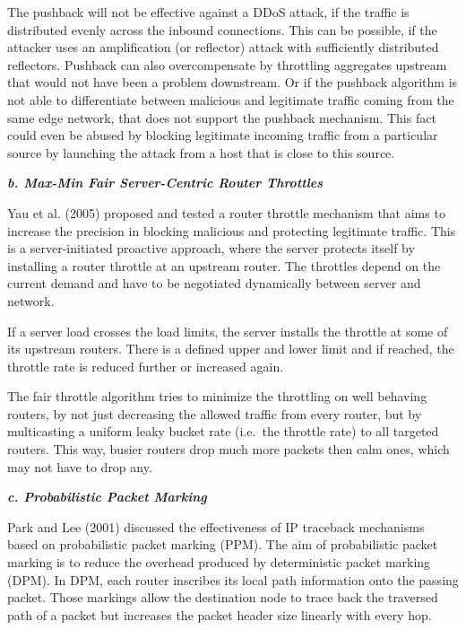 The pushback will not be effective against a DDoS attack, if the traffic is distributed evenly across the inbound connections.
This can be possible, if the attacker uses an amplification (or reflector) attack with sufficiently distributed reflectors.
Pushback can also overcompensate by throttling aggregates upstream that would not have been a problem downstream.
Or if the pushback algorithm is not able to differentiate between malicious and legitimate traffic coming from the same edge network, that does not support the pushback mechanism.
This fact could even be abused by blocking legitimate incoming traffic from a particular source by launching the attack from a host that is close to this source.\cite{Mahajan02}

\textbf{\textit{b. Max-Min Fair Server-Centric Router Throttles}}

Yau et al. (2005) proposed and tested a router throttle mechanism that aims to increase the precision in blocking malicious and protecting legitimate traffic.
This is a server-initiated proactive approach, where the server protects itself by installing a router throttle at an upstream router.
The throttles depend on the current demand and have to be negotiated dynamically between server and network.\cite{Yau05}

If a server load crosses the load limits, the server installs the throttle at some of its upstream routers.
There is a defined upper and lower limit and if reached, the throttle rate is reduced further or increased again.\cite{Yau05}

The fair throttle algorithm tries to minimize the throttling on well behaving routers, by not just decreasing the allowed traffic from every router, but by multicasting a uniform leaky bucket rate (i.e.\ the throttle rate) to all targeted routers.
This way, busier routers drop much more packets then calm ones, which may not have to drop any.\cite{Yau05}

\textbf{\textit{c. Probabilistic Packet Marking}}

Park and Lee (2001) discussed the effectiveness of IP traceback mechanisms based on probabilistic packet marking (PPM).
The aim of probabilistic packet marking is to reduce the overhead produced by deterministic packet marking (DPM).
In DPM, each router inscribes its local path information onto the passing packet.
Those markings allow the destination node to trace back the traversed path of a packet but increases the packet header size linearly with every hop.\cite{Park01}

